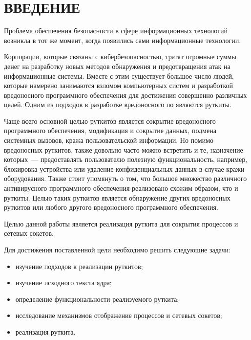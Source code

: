 \chapter*{\hfill{}ВВЕДЕНИЕ\hfill{}}%
\label{cha:vvedenie}

Проблема обеспечения безопасности в сфере информационных технологий возникла в тот же момент, когда появились сами информационные технологии.

Корпорации, которые связаны с кибербезопасностью, тратят огромные суммы денег на разработку новых методов обнаружения и предотвращения атак на информационные системы. Вместе с этим существует большое число людей, которые намерено занимаются взломом компьютерных систем и разработкой вредоносного программного обеспечения для достижения совершенно различных целей. Одним из подходов в разработке вредоносного по являются руткиты.

Чаще всего основной целью руткитов является сокрытие вредоносного программного обеспечения, модификация и сокрытие данных, подмена системных вызовов, кража пользовательской информации. Но помимо вредоносных руткитов, также довольно часто можно встретить и те, назначение которых~--- предоставлять пользователю полезную функциональность, например, блокировка устройства или удаление конфиденциальных данных в случае кражи оборудования. Также стоит упомянуть о том, что большое множество различного антивирусного программного обеспечения реализовано схожим образом, что и руткиты. Целью таких руткитов является обнаружение других вредоносных руткитов или любого другого вредоносного программного обеспечения.

Целью данной работы является реализация руткита для сокрытия процессов и сетевых сокетов.

Для достижения поставленной цели необходимо решить следующие задачи:
\begin{itemize}
    \item
        изучение подходов к реализации руткитов;
    \item
        изучение исходного текста ядра;
    \item
        определение функциональности реализуемого руткита;
    \item
        исследование механизмов отображение процессов и сетевых сокетов;
    \item
        реализация руткита.
\end{itemize}
